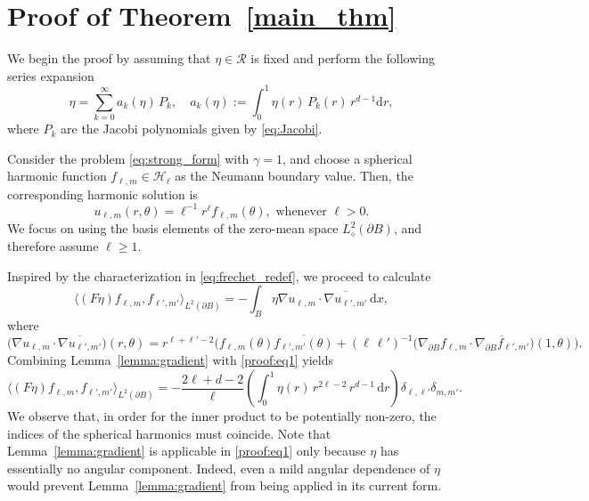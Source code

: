 \documentclass[reqno]{amsart}
\numberwithin{equation}{section}
\numberwithin{figure}{section}
\numberwithin{table}{section}
\theoremstyle{plain}
\theoremstyle{definition}
\theoremstyle{remark}
\newcommand{\inner}[1]{\langle#1\rangle}
\newcommand{\di}{\mathrm{d}}   %
\newcommand{\sphe}{{\partial B}}
\begin{document}
\section{Proof of Theorem~\ref{main_thm}} \label{sec:proof}


We begin the proof by assuming that \( \eta \in \mathcal{R} \) is fixed and perform the following series expansion
%
\begin{equation} \label{proof:eta}
    \eta = \sum^\infty_{k=0} a_k(\eta) \, P_k, \quad a_k(\eta) := \int^1_0 \eta(r) \, P_k(r) \, r^{d-1} \di r,
\end{equation}
%
where \( P_k \) are the Jacobi polynomials given by \eqref{eq:Jacobi}.
%


Consider the problem \eqref{eq:strong_form} with \( \gamma = 1 \), and choose a spherical harmonic function \( f_{\ell, m} \in \mathcal{H}_\ell \) as the Neumann boundary value. 
%
Then, the corresponding harmonic solution is
%
\begin{equation}
    u_{\ell, m}(r, \theta) = \ell^{-1} r^\ell f_{\ell, m}(\theta), \text{ whenever } \ell > 0.
\end{equation}
%
We focus on using the basis elements of the zero-mean space \( L^2_\diamond(\sphe) \), and therefore assume \( \ell \geq 1 \).
%


Inspired by the characterization in \eqref{eq:frechet_redef}, we proceed to calculate
%
\begin{equation} \label{proof:eq1}
    \inner{(F \eta) f_{\ell, m}, f_{\ell', m'}}_{L^2(\sphe)} = -\int_B \eta \nabla u_{\ell, m} \cdot \overline{\nabla u_{\ell', m'}} \,\di x,
\end{equation}
%
where
%
\begin{equation} \label{eq:proof_grad}
    \big( \nabla u_{\ell, m} \cdot \overline{\nabla u_{\ell', m'}} \big) (r, \theta) 
    = r^{\ell+\ell'-2} \big( f_{\ell, m}(\theta) \overline{f_{\ell', m'}(\theta)}
    + (\ell \, \ell')^{-1} \big( \nabla_{\sphe}f_{\ell, m} \cdot \overline{\nabla_{\sphe} f_{\ell', m'}} \big) (1,\theta) \big).
\end{equation}
%
Combining Lemma~\ref{lemma:gradient} with \eqref{proof:eq1} yields
%
\begin{equation} \label{proof:innerproduct}
    \inner{(F \eta) f_{\ell, m}, f_{\ell', m'}}_{L^2(\sphe)} = - \frac{2 \ell + d - 2}{\ell} \left( \int^1_0 \eta(r) \, r^{2 \ell - 2} \, r^{d-1} \, \di r \right) \delta_{\ell, \ell'} \delta_{m , m'}.
\end{equation}
%
We observe that, in order for the inner product to be potentially non-zero, the indices of the spherical harmonics must coincide.
%
Note that Lemma~\ref{lemma:gradient} is applicable in \eqref{proof:eq1} only because \( \eta \) has essentially no angular component.
%
Indeed, even a mild angular dependence of \( \eta \) would prevent Lemma~\ref{lemma:gradient} from being applied in its current form.
%
\end{document}
